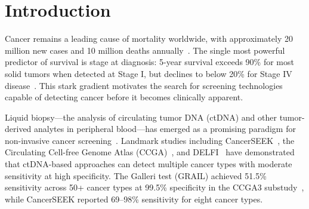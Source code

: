 \documentclass[10pt,a4paper]{article}
\begin{document}
\begin{abstract}
\textbf{Conclusions:} These simulation results suggest that combined multi-modal + longitudinal approaches may theoretically overcome single-timepoint Poisson noise floors, but all findings carry substantial uncertainty from idealized simulation conditions, single-seed evaluation, and statistically underpowered experiments. Critical unaddressed factors include clonal hematopoiesis (affecting 10--15\% of screening-age individuals), ctDNA shedding variability, and the economic feasibility of 50,000$\times$ sequencing depth. Prospective clinical validation with real patient cohorts is required before any clinical deployment consideration.

\textbf{Keywords:} liquid biopsy, circulating tumor DNA, early cancer detection, multi-modal fusion, graph neural network, longitudinal screening, variant calling, simulation study
\end{abstract}


\section{Introduction}

Cancer remains a leading cause of mortality worldwide, with approximately 20 million new cases and 10 million deaths annually~\cite{sung2021global}. The single most powerful predictor of survival is stage at diagnosis: 5-year survival exceeds 90\% for most solid tumors when detected at Stage I, but declines to below 20\% for Stage IV disease~\cite{siegel2024cancer}. This stark gradient motivates the search for screening technologies capable of detecting cancer before it becomes clinically apparent.

Liquid biopsy—the analysis of circulating tumor DNA (ctDNA) and other tumor-derived analytes in peripheral blood—has emerged as a promising paradigm for non-invasive cancer screening~\cite{wan2017liquid,cohen2018detection}. Landmark studies including CancerSEEK~\cite{cohen2018detection}, the Circulating Cell-free Genome Atlas (CCGA)~\cite{liu2020sensitive}, and DELFI~\cite{cristiano2019genome} have demonstrated that ctDNA-based approaches can detect multiple cancer types with moderate sensitivity at high specificity. The Galleri test (GRAIL) achieved 51.5\% sensitivity across 50+ cancer types at 99.5\% specificity in the CCGA3 substudy~\cite{klein2021clinical}, while CancerSEEK reported 69--98\% sensitivity for eight cancer types.
\end{document}
